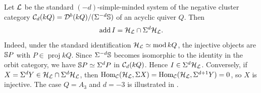\documentclass[11pt,a4paper,dvipsnames,x11names]{amsart}
\begin{document}
\begin{rmk}
Let $\mathcal L$ be the standard $(-d)$-simple-minded system of the negative cluster category $\mathcal C_d(kQ)=\mathcal D^b(kQ)/(\Sigma^{-d}\mathbb S)$ of an acyclic quiver $Q$. Then
\[
\operatorname{add} I=\mathcal H_\mathcal L\cap\Sigma^d\mathcal H_\mathcal L.
\]
Indeed, under the standard identification $\mathcal H_\mathcal L\simeq\operatorname{mod} kQ$, the injective objects are $\mathbb S P$ with $P\in\operatorname{proj}kQ$. Since $\Sigma^{-d}\mathbb S$ becomes isomorphic to the identity in the orbit category, we have $\mathbb S P\simeq\Sigma^dP$ in $\mathcal C_d(kQ)$. Hence $I\in\Sigma^d\mathcal H_\mathcal L$. Conversely, if $X=\Sigma^dY\in\mathcal H_\mathcal L\cap\Sigma^d\mathcal H_\mathcal L$, then $\operatorname{Hom}_\mathcal C(\mathcal H_\mathcal L,\Sigma X)=\operatorname{Hom}_\mathcal C(\mathcal H_\mathcal L,\Sigma^{d+1}Y)=0$, so $X$ is injective. The case $Q=A_3$ and $d=-3$ is illustrated in .
\end{rmk}
\end{document}
